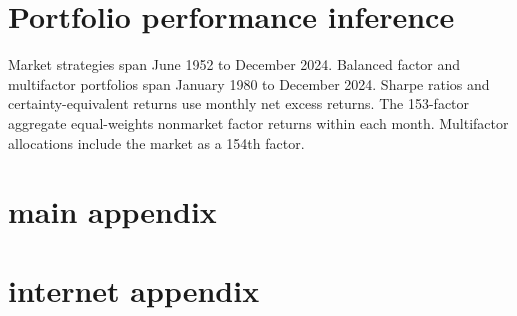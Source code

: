 \documentclass[11pt]{article}
\begin{document}
\section*{Portfolio performance inference}
Market strategies span June 1952 to December 2024. Balanced factor and multifactor portfolios span January 1980 to December 2024. Sharpe ratios and certainty-equivalent returns use monthly net excess returns. The 153-factor aggregate equal-weights nonmarket factor returns within each month. Multifactor allocations include the market as a 154th factor.
\clearpage
\section*{main appendix}


\clearpage
\section*{internet appendix}




\end{document}
